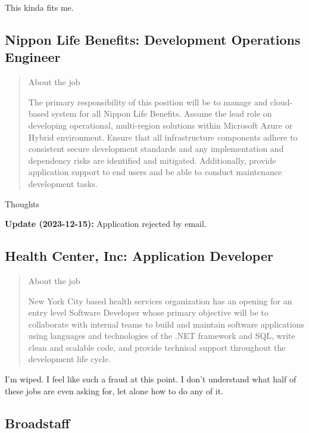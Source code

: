 \documentclass[
	letterpaper, %
	12pt, %
]{CSSullivanBusinessReport}
\begin{document}
This kinda fits me.


\subsection[Nippon Life Benefits]{Nippon Life Benefits: Development Operations Engineer}

\begin{quote}
	About the job
	
	The primary responsibility of this position will be to manage and cloud-based system for all Nippon Life Benefits. Assume the lead role on developing operational, multi-region solutions within Microsoft Azure or Hybrid environment. Ensure that all infrastructure components adhere to consistent secure development standards and any implementation and dependency risks are identified and mitigated. Additionally, provide application support to end users and be able to conduct maintenance development tasks.

\end{quote}

Thoughts

\textbf{Update (2023-12-15):} Application rejected by email.


\subsection[Health Center, Inc]{Health Center, Inc: Application Developer}

\begin{quote}
	About the job
	
	New York City based health services organization has an opening for an entry level Software Developer whose primary objective will be to collaborate with internal teams to build and maintain software applications using languages and technologies of the .NET framework and SQL, write clean and scalable code, and provide technical support throughout the development life cycle.

\end{quote}

I'm wiped. I feel like such a fraud at this point. I don't understand what half of these jobs are even asking for, let alone how to do any of it. 



\subsection[Broadstaff]{Broadstaff}
\end{document}
